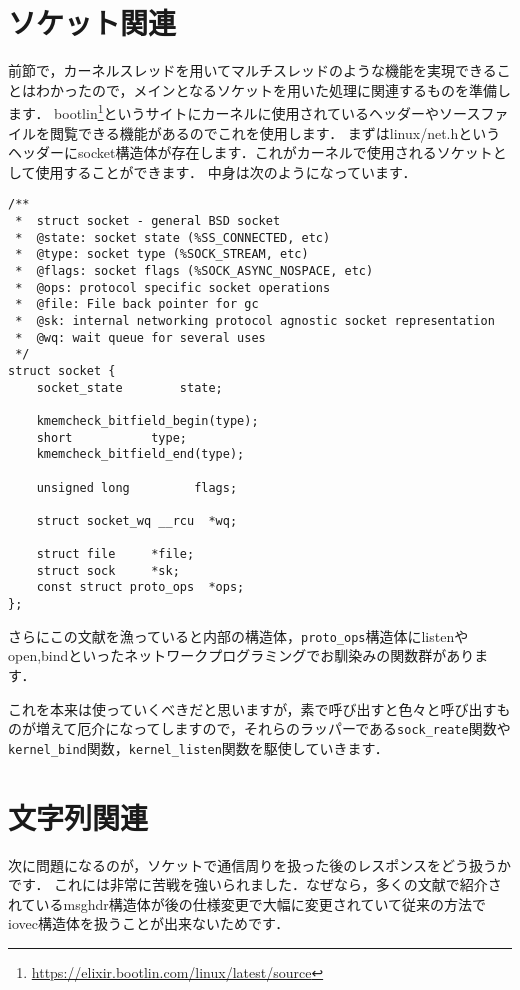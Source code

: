 \section{ソケット関連}

前節で，カーネルスレッドを用いてマルチスレッドのような機能を実現できることはわかったので，メインとなるソケットを用いた処理に関連するものを準備します．
bootlin\footnote{\url{https://elixir.bootlin.com/linux/latest/source}}というサイトにカーネルに使用されているヘッダーやソースファイルを閲覧できる機能があるのでこれを使用します．
まずはlinux/net.hというヘッダーにsocket構造体が存在します．これがカーネルで使用されるソケットとして使用することができます．
中身は次のようになっています．
\begin{verbatim}
/**
 *  struct socket - general BSD socket
 *  @state: socket state (%SS_CONNECTED, etc)
 *  @type: socket type (%SOCK_STREAM, etc)
 *  @flags: socket flags (%SOCK_ASYNC_NOSPACE, etc)
 *  @ops: protocol specific socket operations
 *  @file: File back pointer for gc
 *  @sk: internal networking protocol agnostic socket representation
 *  @wq: wait queue for several uses
 */
struct socket {
    socket_state        state;

    kmemcheck_bitfield_begin(type);
    short           type;
    kmemcheck_bitfield_end(type);

    unsigned long         flags;

    struct socket_wq __rcu  *wq;

    struct file     *file;
    struct sock     *sk;
    const struct proto_ops  *ops;
};
\end{verbatim}

さらにこの文献を漁っていると内部の構造体，\verb|proto_ops|構造体にlistenやopen,bindといったネットワークプログラミングでお馴染みの関数群があります．

これを本来は使っていくべきだと思いますが，素で呼び出すと色々と呼び出すものが増えて厄介になってしますので，それらのラッパーである\verb|sock_reate|関数や\verb|kernel_bind|関数，\verb|kernel_listen|関数を駆使していきます．

\section{文字列関連}
次に問題になるのが，ソケットで通信周りを扱った後のレスポンスをどう扱うかです．
これには非常に苦戦を強いられました．なぜなら，多くの文献で紹介されているmsghdr構造体が後の仕様変更で大幅に変更されていて従来の方法でiovec構造体を扱うことが出来ないためです．

